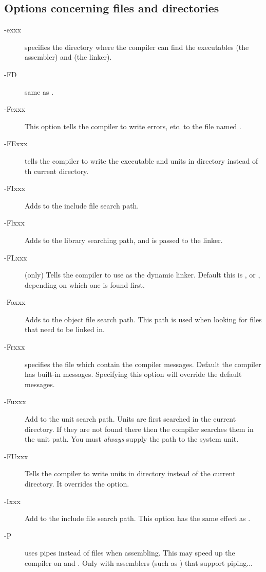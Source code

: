 \documentclass{report}
\begin{document}
%
%
\subsection{Options concerning files and directories}
\begin{description}
\item [-exxx]  specifies the directory where the
compiler can find the executables  (the assembler) and 
(the linker).
\item [-FD] same as .
\item [-Fexxx] This option tells the compiler to write errors, etc. to
the file named .
\item [-FExxx] tells the compiler to write the executable and units in
directory  instead of th current directory.
\item [-FIxxx] Adds  to the include file search path.
\item [-Flxxx] Adds  to the library searching path, and is passed
to the linker.
\item[-FLxxx] (\linux only) Tells the compiler to use  as the
dynamic linker. Default this is , or
, depending on which one is found first.
\item[-Foxxx] Adds  to the object file search path.
This path is used when looking for files that need to be linked in.
\item [-Frxxx]  specifies the file which contain the compiler
messages. Default the compiler has built-in messages. Specifying this option
will override the default messages.
\item [-Fuxxx] Add  to the unit search path.
Units are first searched in the current directory.
If they are not found there then the compiler searches them in the unit path.
You must {\em always} supply the path to the system unit.
\item [-FUxxx] Tells the compiler to write units in directory 
instead of the current directory. It overrides the  option.
\item [-Ixxx]  Add  to the include file search path.
This option has the same effect as .
\item [-P] uses pipes instead of files when assembling. This may speed up
the compiler on \ostwo and \linux. Only with assemblers (such as \gnu
{}) that support piping...
\end{description}
\end{document}
